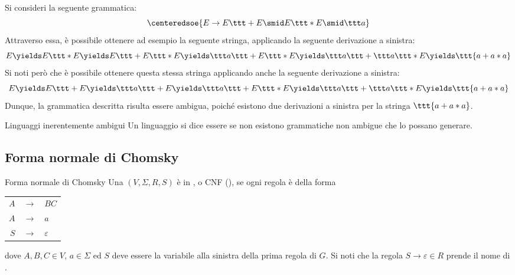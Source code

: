 \documentclass[a4paper, 12pt]{report}
\begin{document}
    \begin{example}
        Si consideri la seguente grammatica: $$\centeredsoe{E \to E \ttt + E \smid E \ttt * E \smid \ttt a}$$ Attraverso essa, è possibile ottenere ad esempio la seguente stringa, applicando la seguente derivazione a sinistra: $$E \yields E \ttt * E \yields E \ttt + E \ttt * E \yields \ttt a \ttt + E \ttt * E \yields \ttt a \ttt + \ttt a \ttt * E \yields \ttt{a+a*a}$$ Si noti però che è possibile ottenere questa stessa stringa applicando anche la seguente derivazione a sinistra: $$E \yields E \ttt + E \yields \ttt a \ttt + E \yields \ttt a \ttt + E \ttt * E \yields \ttt a \ttt + \ttt a \ttt * E \yields \ttt{a+a*a}$$ Dunque, la grammatica descritta risulta essere ambigua, poiché esistono due derivazioni a sinistra per la stringa $\ttt{a+a*a}$.
    \end{example}

    \begin{frameddefn}{Linguaggi inerentemente ambigui}
        Un linguaggio si dice essere  se non esistono grammatiche non ambigue che lo possano generare.
    \end{frameddefn}

    \subsection{Forma normale di Chomsky}

    \begin{frameddefn}{Forma normale di Chomsky}
        Una \CFG $(V, \Sigma, R, S)$ è in , o CNF (), se ogni regola è della forma

        \begin{center}
            \begin{tabular}{rcl}
                $A$ & $\to$ & $BC$ \\ 
                $A$ & $\to$ & $a$ \\
                $S$ & $\to$ & $\varepsilon$
            \end{tabular}
        \end{center}

        dove $A, B, C \in V$, $a \in \Sigma$ ed $S$ deve essere la variabile alla sinistra della prima regola di $G$. Si noti che la regola $S \to \varepsilon \in R$ prende il nome di .
    \end{frameddefn}
\end{document}
